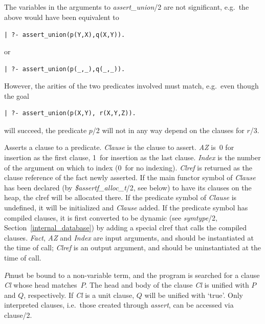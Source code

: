 \begin{description}
    The variables in the arguments to {\em assert\_\/union}/2
    are not significant, e.g.\ the above would have been equivalent to
    \begin{center}
    {\tt | ?- assert\_union(p(Y,X),q(X,Y)).}
    \end{center}
    or
    \begin{center}
    {\tt | ?- assert\_union(p(\_,\_),q(\_,\_)).}
    \end{center}
    However, the arities of the two predicates involved must match,
    e.g.\ even though the goal
\begin{center}
\begin{minipage}{3in}
\begin{verbatim}
| ?- assert_union(p(X,Y), r(X,Y,Z)).
\end{verbatim}
\end{minipage}
\end{center}
    will succeed, the predicate $p$/2 will not in any way depend on the
    clauses for $r$/3.

\item[{\bf assert}({\em Clause}, {\em AZ}, {\em Index},{\em Clref})]
    Asserts a clause to a predicate.
    {\em Clause} is the clause to assert.
    {\em AZ} is~0 for insertion as the first clause,
    1~for insertion as the last clause.
    {\em Index} is the number of the argument on which to index
    (0~for no indexing).
    {\em Clref} is returned as the clause reference of the fact newly asserted.
    If the main functor symbol of {\em Clause} has been declared
    (by {\em \$assertf\_alloc\_t}/2, see below) to have its clauses on the heap,
    the clref will be allocated there.
    If the predicate symbol of {\em Clause} is undefined,
    it will be initialized and {\em Clause} added.
    If the predicate symbol has compiled clauses, it is first
    converted to be dynamic (see {\em symtype}/2,
    Section~\ref{internal_database})
    by adding a special clref that calls the compiled clauses.
    {\em Fact}, {\em AZ} and {\em Index} are input arguments,
    and should be instantiated at the time of call;
    {\em Clref} is an output argument,
    and should be uninstantiated at the time of call.

\item[{\bf clause}($P$,$Q$)] 
    $P$must be bound to a non-variable term, and the
    program is searched for a clause {\em Cl} whose head matches~$P$.
    The head and body of the clause {\em Cl} is unified with $P$ and $Q$,
    respectively.
    If {\em Cl} is a unit clause, $Q$ will be unified with `true'.
    Only interpreted clauses, i.e.\ those created through {\em assert},
    can be accessed via clause/2.


\end{description}
